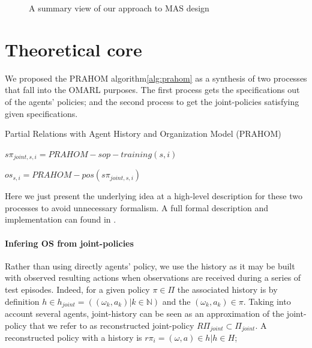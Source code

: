 \documentclass[runningheads]{llncs}
\begin{document}
\begin{figure}[h!]
    \centering
    
    \caption{A summary view of our approach to MAS design}
    \label{fig:design_approach}
\end{figure}

\section{Theoretical core}

We proposed the PRAHOM algorithm\autoref{alg:prahom} as a synthesis of two processes that fall into the OMARL purposes. The first process gets the specifications out of the agents' policies; and the second process to get the joint-policies satisfying given specifications.


\begin{algorithm}[hbt!]
    \caption{Partial Relations with Agent History and Organization Model (PRAHOM)}\label{alg:prahom}



    $s\pi_{joint,s,i} = PRAHOM-sop-training(s,i)$

    $os_{s,i} = PRAHOM-pos(s\pi_{joint,s,i})$

\end{algorithm}

Here we just present the underlying idea at a high-level description for these two processes to avoid unnecessary formalism. A full formal description and implementation can found in \cite{}.

\paragraph{\textbf{Infering OS from joint-policies}}

Rather than using directly agents' policy, we use the history as it may be built with observed resulting actions when observations are received during a series of test episodes. Indeed, for a given policy $\pi \in \Pi$ the associated history is by definition $h \in h_{joint} = ((\omega_k,a_k) | k \in \mathbb{N})$ and the $(\omega_k,a_k) \in \pi$. Taking into account several agents, joint-history can be seen as an approximation of the joint-policy that we refer to as reconstructed joint-policy $R\Pi_{joint} \subset \Pi_{joint}$. A reconstructed policy with a history is $r\pi_i = {(\omega, a) \in h | h \in H}$;
\end{document}
